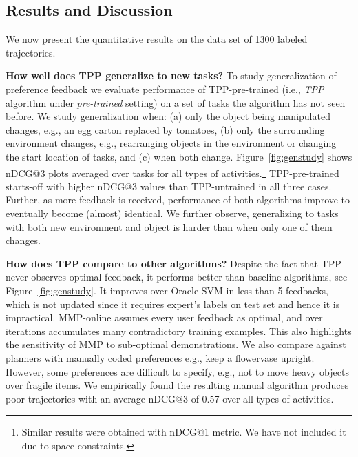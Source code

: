 \subsection{Results and Discussion}

\label{sec:results}

 We now present the quantitative results on the data set of 1300 labeled trajectories. 

\textbf{How well does TPP generalize to new tasks?} To study generalization of preference feedback we evaluate performance of TPP-pre-trained (i.e., \textit{TPP} algorithm under \textit{pre-trained} setting) on a set of tasks the algorithm has not seen before. We study generalization when: (a) only the object being manipulated changes, e.g., an egg carton replaced by tomatoes, (b) only the surrounding environment changes, e.g., rearranging objects in the environment or changing the start location of tasks, and (c) when both change.
Figure~\ref{fig:genstudy} shows nDCG@3 plots averaged over tasks for all types of activities.\footnote{Similar 
results were obtained with nDCG@1 metric. We have not included it due to space constraints.} TPP-pre-trained starts-off with higher nDCG@3 values than TPP-untrained in all three cases. Further, as more feedback is received, performance of both algorithms improve to eventually become (almost) identical. We further observe, generalizing to tasks with both new environment and object is harder than when only one of them changes.

\textbf{How does TPP compare to other algorithms?} Despite the fact that TPP never observes optimal feedback, it performs better than baseline algorithms, see Figure~\ref{fig:genstudy}. 
 It improves over Oracle-SVM in less than 5 feedbacks, which is not updated since it requires expert's labels on test set and hence it is impractical. MMP-online assumes every user feedback as optimal, and over iterations accumulates many contradictory training examples. This also highlights the sensitivity of MMP to sub-optimal demonstrations. We also compare against planners with manually coded preferences e.g., keep a flowervase upright. However, some preferences are difficult to specify, e.g., not to move heavy objects over fragile items. We empirically found the resulting manual algorithm produces poor trajectories with an average nDCG@3 of 0.57 over all types of activities. 

